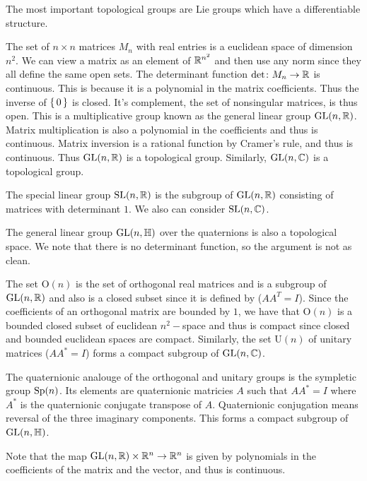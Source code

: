 \documentclass[letterpaper, 11pt, oneside]{book}
\begin{document}
The most important topological groups are Lie groups which have a differentiable structure.

\begin{ex}
  The set of $n \times n$ matrices $M_{n}$ with real entries is a euclidean space of dimension $n^{2}$.
  We can view a matrix as an element of $\mathbb{R}^{n^{2}}$ and then use any norm since they all define the same open sets.
  The determinant function $\det\colon M_{n} \to \mathbb{R}$ is continuous.
  This is because it is a polynomial in the matrix coefficients.
  Thus the inverse of $\set{0}$ is closed.
  It's complement, the set of nonsingular matrices, is thus open.
  This is a multiplicative group known as the general linear group $\operatorname{GL}(n, \mathbb{R})$.
  Matrix multiplication is also a polynomial in the coefficients and thus is continuous.
  Matrix inversion is a rational function by Cramer's rule, and thus is continuous.
  Thus $\operatorname{GL}(n, \mathbb{R})$ is a topological group.
  Similarly, $\operatorname{GL}(n, \mathbb{C})$ is a topological group.

  The special linear group $\operatorname{SL}(n, \mathbb{R})$ is the subgroup of $\operatorname{GL}(n, \mathbb{R})$ consisting of matrices with determinant $1$.
  We also can consider $\operatorname{SL}(n, \mathbb{C})$.

  The general linear group $\operatorname{GL}(n, \mathbb{H})$ over the quaternions is also a topological space.
  We note that there is no determinant function, so the argument is not as clean.

  The set $\text{O}(n)$ is the set of orthogonal real matrices and is a subgroup of $\operatorname{GL}(n, \mathbb{R})$ and also is a closed subset since it is defined by  ($A A^{T} = I$).
  Since the coefficients of an orthogonal matrix are bounded by $1$, we have that $\text{O}(n)$ is a bounded closed subset of euclidean $n^{2}-$space and thus is compact since closed and bounded euclidean spaces are compact.
  Similarly, the set $\text{U}(n)$ of unitary matrices ($A A^{*} = I$) forms a compact subgroup of $\operatorname{GL}(n, \mathbb{C})$.

  The quaternionic analouge of the orthogonal and unitary groups is the sympletic group $\operatorname{Sp}(n)$.
  Its elements are quaternionic matricies $A$ such that $A A^{*} = I$ where $A^{*}$ is the quaternionic conjugate transpose of $A$.
  Quaternionic conjugation means reversal of the three imaginary components.
  This forms a compact subgroup of $\operatorname{GL}(n, \mathbb{H})$.
\end{ex}

Note that the map $\operatorname{GL}(n, \mathbb{R}) \times \mathbb{R}^{n} \to \mathbb{R}^{n}$ is given by polynomials in the coefficients of the matrix and the vector, and thus is continuous.
\end{document}
